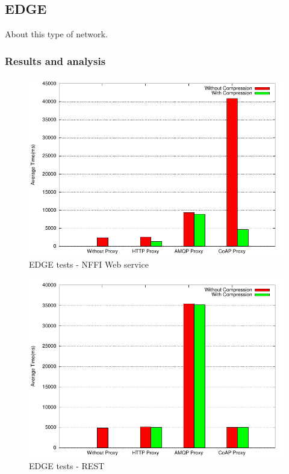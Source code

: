 \subsection{EDGE}

About this type of network.

\subsubsection{Results and analysis}

\begin{figure}[H]
\center
\includegraphics[scale=0.75]{../results/edge/nffi/result.pdf}
\caption{EDGE tests - NFFI Web service}
\end{figure}

\begin{figure}[H]
\center
\includegraphics[scale=0.75]{../results/edge/rest/result.pdf}
\caption{EDGE  tests - REST}
\end{figure}


